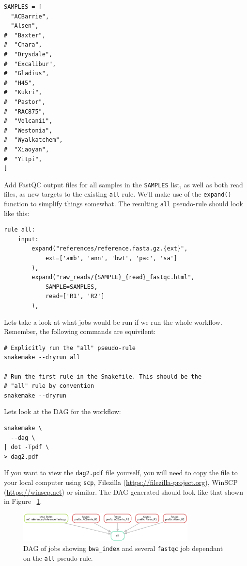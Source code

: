 \begin{lstlisting}
SAMPLES = [
  "ACBarrie",
  "Alsen",
#  "Baxter",
#  "Chara",
#  "Drysdale",
#  "Excalibur",
#  "Gladius",
#  "H45",
#  "Kukri",
#  "Pastor",
#  "RAC875",
#  "Volcanii",
#  "Westonia",
#  "Wyalkatchem",
#  "Xiaoyan",
#  "Yitpi",
]
\end{lstlisting}

Add FastQC output files for all samples in the \texttt{SAMPLES} list, as well as both read files, as new targets to the existing \texttt{all} rule. We'll make use of the \texttt{expand()}
function to simplify things somewhat. The resulting \texttt{all} pseudo-rule should look like this:

\begin{lstlisting}
rule all:
	input:
		expand("references/reference.fasta.gz.{ext}",
			ext=['amb', 'ann', 'bwt', 'pac', 'sa']
		),
		expand("raw_reads/{SAMPLE}_{read}_fastqc.html",
			SAMPLE=SAMPLES,
			read=['R1', 'R2']
		),
\end{lstlisting}

Lets take a look at what jobs would be run if we run the whole workflow. Remember, the following commands are equivilent:

\begin{lstlisting}
# Explicitly run the "all" pseudo-rule
snakemake --dryrun all

# Run the first rule in the Snakefile. This should be the
# "all" rule by convention
snakemake --dryrun
\end{lstlisting}

Lets look at the DAG for the workflow:

\begin{lstlisting}
snakemake \
  --dag \
| dot -Tpdf \
> dag2.pdf
\end{lstlisting}

\begin{warning}

If you want to view the \texttt{dag2.pdf} file yourself, you will need to copy the file to your local computer using \texttt{scp},
Filezilla (\url{https://filezilla-project.org}), WinSCP (\url{https://winscp.net}) or similar. The DAG generated should look like
that shown in Figure ~\ref{fig:dag2}.

\end{warning}

\begin{figure}[H]
\centering
\includegraphics[width=0.8\textwidth]{handout/dag2.pdf}
\caption{DAG of jobs showing \texttt{bwa\_index} and several \texttt{fastqc} job dependant on the \texttt{all} pseudo-rule.}
\label{fig:dag2}
\end{figure}


